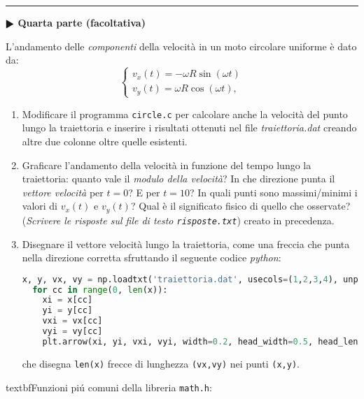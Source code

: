 \documentclass[11pt]{article}
\begin{document}
\hrule
\vspace{1mm}\textbf{$\RHD$ Quarta parte (facoltativa)\\}

L'andamento delle {\em componenti\/} della velocit\`a in un moto circolare uniforme \`e dato da:
\[
\left\{ \begin{array}{ll} 
v_x(t) = - \omega R \sin \left(\omega t \right)
\\ 
v_y(t) = \omega R \cos \left(\omega t \right),
\end{array}
\right.
\]

\begin{enumerate}
\item Modificare il programma \texttt{circle.c} per calcolare anche la velocit\`a del punto lungo la traiettoria e inserire i risultati ottenuti nel file {\em traiettoria.dat} creando altre due colonne oltre quelle esistenti.
\item Graficare l'andamento della velocit\`a in funzione del tempo lungo la traiettoria: quanto vale il {\em modulo della velocit\`a\/}? In che direzione punta il {\em vettore velocit\`a\/} per $t=0$?
E per $t=10$? In quali punti  sono massimi/minimi i valori di $v_x(t)$ e $v_y(t)$? Qual \`e il significato fisico di quello che osservate? ({\em Scrivere le risposte sul file di testo \texttt{risposte.txt}\/}) creato in precedenza.
\item Disegnare il vettore velocit\`a lungo la traiettoria, come una freccia che punta nella direzione corretta sfruttando
  il seguente codice \emph{python}:\\

\begin{lstlisting}[language=Python,numbers=none]
  x, y, vx, vy = np.loadtxt('traiettoria.dat', usecols=(1,2,3,4), unpack=True)
  for cc in range(0, len(x)):
    xi = x[cc]
    yi = y[cc]
    vxi = vx[cc]
    vyi = vy[cc]
    plt.arrow(xi, yi, vxi, vyi, width=0.2, head_width=0.5, head_length=0.3,           fc='r', ec='r')   
\end{lstlisting}
che disegna \texttt{len(x)} frecce di lunghezza \texttt{(vx,vy)} nei punti \texttt{(x,y)}. 
\end{enumerate}  
\vspace{-2mm}
\newpage
textbf{Funzioni pi\'u comuni della libreria \texttt{math.h}:}
\end{document}
